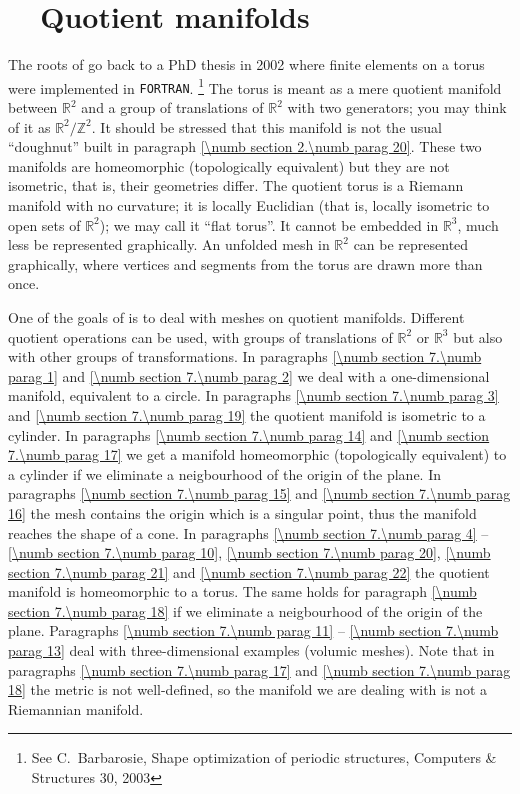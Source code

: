 
\chapter{~~Quotient manifolds}\label{\numb section 7}


The roots of {\maniFEM} go back to a PhD thesis in 2002
where finite elements on a torus were implemented in {\small\tt FORTRAN}.%
\footnote {{} See %
C.~Barbarosie, Shape optimization of periodic structures,
Computers \& Structures 30, 2003}
The torus is meant as a mere quotient manifold between $ \mathbb{R}^2 $ and a group of
translations of $ \mathbb{R}^2 $ with two generators;
you may think of it as $ {\mathbb R}^2/{\mathbb Z}^2 $.
It should be stressed that this manifold is not the usual ``doughnut'' built in paragraph
\ref{\numb section 2.\numb parag 20}.
These two manifolds are homeomorphic (topologically equivalent) but they are not isometric,
that is, their geometries differ.
The quotient torus is a Riemann manifold with no curvature; it is locally Euclidian
(that is, locally isometric to open sets of $ \mathbb{R}^2 $); we may call it ``flat torus''.
It cannot be embedded in $ \mathbb{R}^3 $, much less be represented graphically.
An unfolded mesh in $ \mathbb{R}^2 $ can be represented graphically, where vertices and segments
from the torus are drawn more than once.

One of the goals of {\maniFEM} is to deal with meshes on quotient manifolds.
Different quotient operations can be used, with groups of translations of $ \mathbb{R}^2 $
or $ \mathbb{R}^3 $ but also with other groups of transformations.
In paragraphs \ref{\numb section 7.\numb parag 1} and \ref{\numb section 7.\numb parag 2}
we deal with a one-dimensional manifold, equivalent to a circle.
In paragraphs \ref{\numb section 7.\numb parag 3} and \ref{\numb section 7.\numb parag 19}
the quotient manifold is isometric to a cylinder.
In paragraphs \ref{\numb section 7.\numb parag 14} and \ref{\numb section 7.\numb parag 17}
we get a manifold homeomorphic (topologically equivalent) to a cylinder
if we eliminate a neigbourhood of the origin of the plane.
In paragraphs \ref{\numb section 7.\numb parag 15} and \ref{\numb section 7.\numb parag 16}
the mesh contains the origin which is a singular point, thus the manifold reaches
the shape of a cone.
In paragraphs \ref{\numb section 7.\numb parag 4} -- \ref{\numb section 7.\numb parag 10},
\ref{\numb section 7.\numb parag 20}, \ref{\numb section 7.\numb parag 21} and
\ref{\numb section 7.\numb parag 22}
the quotient manifold is homeomorphic to a torus.
The same holds for paragraph \ref{\numb section 7.\numb parag 18}
if we eliminate a neigbourhood of the origin of the plane.
Paragraphs \ref{\numb section 7.\numb parag 11} -- \ref{\numb section 7.\numb parag 13} deal with
three-dimensional examples (volumic meshes).
Note that in paragraphs \ref{\numb section 7.\numb parag 17} and
\ref{\numb section 7.\numb parag 18} the metric is not well-defined,
so the manifold we are dealing with is not a Riemannian manifold.


